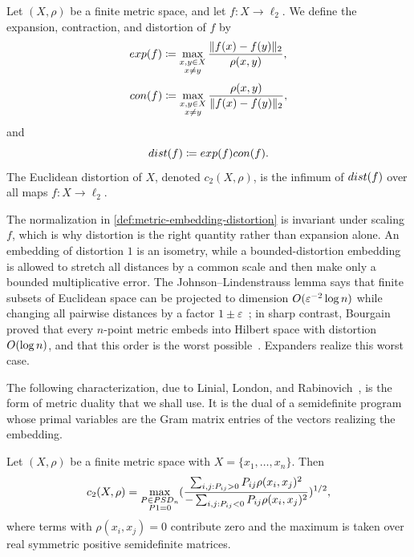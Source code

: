 \begin{definition}
	\label{def:metric-embedding-distortion}
	Let \((X,\rho)\) be a finite metric space, and let \(f\colon X\to \ell_2\). We define the expansion, contraction, and distortion of \(f\) by
	\begin{equation}
		\label{eq:embedding-expansion-definition}
		exp(f)\coloneqq \max_{\substack{x,y\in X\\x\neq y}}\frac{\lVert f(x)-f(y)\rVert_2}{\rho(x,y)},
	\end{equation}
	\begin{equation}
		\label{eq:embedding-contraction-definition}
		con(f)\coloneqq \max_{\substack{x,y\in X\\x\neq y}}\frac{\rho(x,y)}{\lVert f(x)-f(y)\rVert_2},
	\end{equation}
	and
	\begin{equation}
		\label{eq:embedding-distortion-definition}
		dist(f)\coloneqq exp(f)con(f).
	\end{equation}
	The Euclidean distortion of \(X\), denoted \(c_2(X,\rho)\), is the infimum of \(dist(f)\) over all maps \(f\colon X\to \ell_2\).
\end{definition}

The normalization in \cref{def:metric-embedding-distortion} is invariant under scaling \(f\), which is why distortion is the right quantity rather than expansion alone. An embedding of distortion \(1\) is an isometry, while a bounded-distortion embedding is allowed to stretch all distances by a common scale and then make only a bounded multiplicative error. The Johnson--Lindenstrauss lemma says that finite subsets of Euclidean space can be projected to dimension \(\bigO(\varepsilon^{-2}\log n)\) while changing all pairwise distances by a factor \(1\pm\varepsilon\)~\cite{JL1984}; in sharp contrast, Bourgain proved that every \(n\)-point metric embeds into Hilbert space with distortion \(\bigO(\log n)\), and that this order is the worst possible~\cite{Bou1985}. Expanders realize this worst case.

The following characterization, due to Linial, London, and Rabinovich~\cite{LLR1995}, is the form of metric duality that we shall use. It is the dual of a semidefinite program whose primal variables are the Gram matrix entries of the vectors realizing the embedding.

\begin{theorem}
	\label{thm:llr-euclidean-distortion-dual}
	Let \((X,\rho)\) be a finite metric space with \(X=\{x_1,\ldots,x_n\}\). Then
	\begin{equation}
		\label{eq:llr-dual-characterization}
		c_2(X,\rho)=\max_{\substack{P\in PSD_n\\P1=0}}
		(
		\frac{\sum_{i,j:P_{ij}>0}P_{ij}\rho(x_i,x_j)^2}
		{-\sum_{i,j:P_{ij}<0}P_{ij}\rho(x_i,x_j)^2}
		)^{1/2},
	\end{equation}
	where terms with \(\rho(x_i,x_j)=0\) contribute zero and the maximum is taken over real symmetric positive semidefinite matrices.
\end{theorem}

